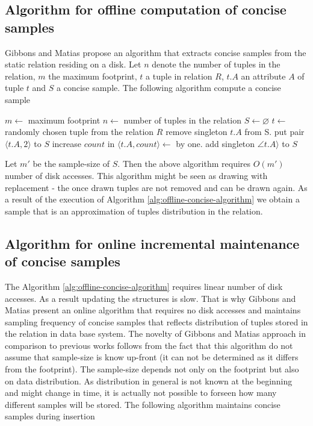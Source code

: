\subsection{Algorithm for offline computation of concise samples }
Gibbons and Matias \cite{GM98} propose an algorithm that extracts
concise samples from the static relation residing on a disk.
Let $n$ denote the number of tuples in the relation, $m$ the
maximum footprint, $t$ a tuple in relation $R$, $t.A$ an attribute $A$
of tuple $t$ and $S$ a concise sample. The following algorithm
compute a concise sample

\begin{center}
    \label{alg:offline-concise-algorithm}
\begin{algorithmic}
  \State $m \gets$ maximum footprint
  \State $n \gets$ number of tuples in the relation
  \State $S \gets  \varnothing$
    \State $t \gets$ randomly chosen tuple from the relation $R$
        \State remove singleton $t.A$ from S.
        \State put pair $\langle t.A, 2 \rangle$ to $S$
        \State increase $count$ in $\langle t.A, count
        \rangle \gets$ by one.
    \Else
        \State add singleton $\angle t.A \rangle$ to $S$
    \EndIf
    \EndWhile
  \end{algorithmic}
\end{center}

Let $m'$ be the sample-size of $S$. Then the above algorithm requires
$O(m')$ number of disk accesses. This algorithm might be seen
as drawing with replacement - the once drawn tuples are
not removed and can be drawn again. As a result of the execution of
Algorithm \ref{alg:offline-concise-algorithm} we obtain
a sample that is an approximation of tuples distribution in the relation.

\subsection{Algorithm for online incremental maintenance of concise samples}
The Algorithm \ref{alg:offline-concise-algorithm} requires
linear number of disk accesses. As a result updating the structures is slow. That is why
Gibbons and Matias \cite{GM98} present an online algorithm that requires no disk
accesses and maintains sampling frequency of concise samples that
reflects distribution of tuples stored in the relation in data base system.
The novelty of Gibbons and Matias approach in comparison to previous
works follows from the fact that this algorithm do not assume that
sample-size is know up-front (it can not be determined as it differs from the footprint).
The sample-size depends not only on the footprint but also on data
distribution. As distribution in general is not known at the beginning
and might change in time, it is actually not possible to forseen how many different
samples will be stored. The following algorithm maintains concise
samples during insertion

